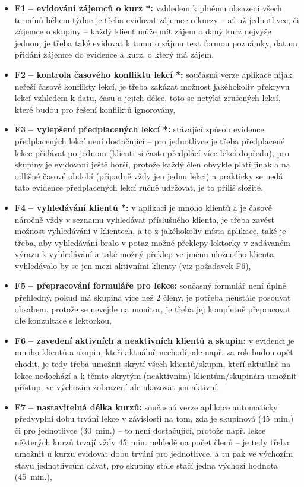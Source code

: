 \begin{itemize}
    \item \textbf{F1 -- evidování zájemců o kurz *:} vzhledem k plnému obsazení všech termínů během týdne je třeba evidovat zájemce o kurzy -- ať už jednotlivce, či zájemce o skupiny -- každý klient může mít zájem o daný kurz nejvýše jednou, je třeba také evidovat k tomuto zájmu text formou poznámky, datum přidání zájemce do evidence a kurz, o který má zájem,
    \item \textbf{F2 -- kontrola časového konfliktu lekcí *:} současná verze aplikace nijak neřeší časové konflikty lekcí, je třeba zakázat možnost jakéhokoliv překryvu lekcí vzhledem k datu, času a jejich délce, toto se netýká zrušených lekcí, které budou pro řešení konfliktů ignorovány,
    \item \textbf{F3 -- vylepšení předplacených lekcí *:} stávající způsob evidence předplacených lekcí není dostačující -- pro jednotlivce je třeba předplacené lekce přidávat po jednom (klienti si často předplácí více lekcí dopředu), pro skupiny je evidování ještě horší, protože každý člen obvykle platí jinak a na odlišné časové období (případně vždy jen jednu lekci) a prakticky se nedá tato evidence předplacených lekcí ručně udržovat, je to příliš složité,
    \item \textbf{F4 -- vyhledávání klientů *:} v aplikaci je mnoho klientů a je časově náročně vždy v seznamu vyhledávat příslušného klienta, je třeba zavést možnost vyhledávání v klientech, a to z jakéhokoliv místa aplikace, také je třeba, aby vyhledávání bralo v potaz možné překlepy lektorky v zadávaném výrazu k vyhledávání a také možný překlep ve jménu uloženého klienta, vyhledávalo by se jen mezi aktivními klienty (viz požadavek F6),
    \item \textbf{F5 -- přepracování formuláře pro lekce:} současný formulář není úplně přehledný, pokud má skupina více než 2 členy, je potřeba neustále posouvat obsahem, protože se nevejde na monitor, je třeba jej kompletně přepracovat dle konzultace s lektorkou,
    \item \textbf{F6 -- zavedení aktivních a neaktivních klientů a skupin:} v evidenci je mnoho klientů a skupin, kteří aktuálně nechodí, ale např. za rok budou opět chodit, je tedy třeba umožnit skrytí všech klientů/skupin, kteří aktuálně na lekce nedochází a k těmto skrytým (neaktivním) klientům/skupinám umožnit přístup, ve výchozím zobrazení ale ukazovat jen aktivní,
    \item \textbf{F7 -- nastavitelná délka kurzů:} současná verze aplikace automaticky předvyplní dobu trvání lekce v závislosti na tom, zda je skupinová (45~min.) či pro jednotlivce (30~min.) -- to není dostačující, protože např. lekce některých kurzů trvají vždy 45~min. nehledě na počet členů -- je tedy třeba umožnit u kurzu evidovat dobu trvání pro jednotlivce, a tu pak ve výchozím stavu jednotlivcům dávat, pro skupiny stále stačí jedna výchozí hodnota (45~min.),

\end{itemize}
